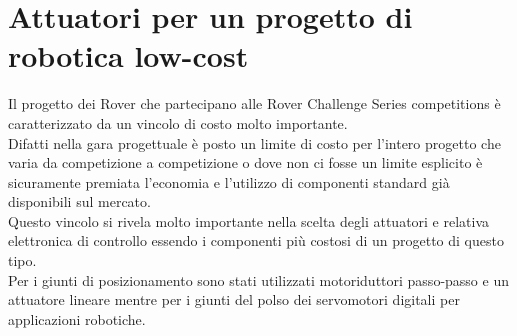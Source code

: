 \documentclass[%
corpo=11pt,
twoside,
 stile=classica,
oldstyle,
greek,%
]{toptesi}
\begin{document}
\chapter{Attuatori per un progetto di robotica low-cost} 
Il progetto dei Rover che partecipano alle Rover Challenge Series competitions è caratterizzato da un vincolo di costo molto importante.\\
 Difatti nella gara progettuale è posto un limite di costo per l'intero progetto che varia da competizione a competizione o dove non ci fosse un limite esplicito è sicuramente premiata l'economia e l'utilizzo di componenti standard già disponibili sul mercato. \\
Questo vincolo si rivela molto importante nella scelta degli attuatori e relativa elettronica di controllo essendo i componenti più costosi di un progetto di questo tipo. \\
Per i giunti di posizionamento sono stati utilizzati motoriduttori passo-passo e un attuatore lineare mentre per i giunti del polso dei servomotori digitali per applicazioni robotiche. 
\end{document}
